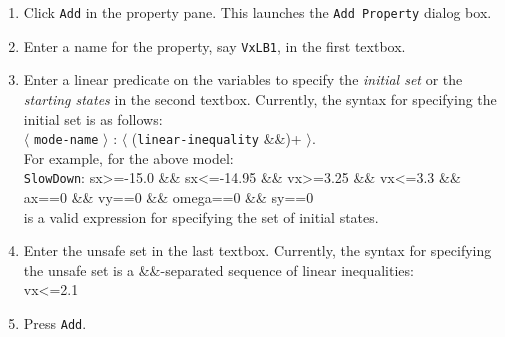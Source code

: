\documentclass{tufte-book} %
\begin{document}
\begin{enumerate}
\item Click \texttt{Add} in the property pane. This launches the \texttt{Add Property} dialog box.
\item Enter a name for the property, say \texttt{VxLB1}, in the first textbox.
\item Enter a linear predicate on the variables to specify the {\em initial set\/} or the {\em starting states\/} in the second textbox. 
Currently, the syntax for specifying the initial set is as follows:\\
$\langle$ \texttt{mode-name} $\rangle$ : $\langle$ (\texttt{linear-inequality} \&\&)+ $\rangle$. \\
For example, for the above model: \\
\texttt{SlowDown}: sx>=-15.0 \&\& sx<=-14.95 
\&\& vx>=3.25 \&\& vx<=3.3 \&\& ax==0 \&\& vy==0
\&\& omega==0 \&\& sy==0  \\
is a valid expression for specifying the set of initial states. 
\item Enter the unsafe set in the last textbox.
Currently, the syntax for specifying the unsafe set is a \&\&-separated sequence of linear inequalities:\\
vx<=2.1 
\item Press \texttt{Add}.
\end{enumerate}
%
\end{document}
